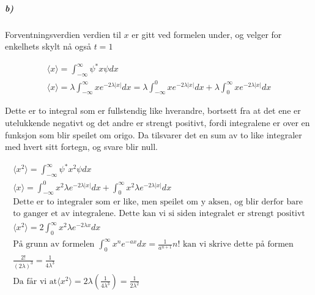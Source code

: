 \documentclass[11pt, A4paper,norsk]{article}
\begin{document}
			\subparagraph{b)}
				\begin{flushleft}
Forventningsverdien verdien til $x$ er gitt ved formelen under, og velger for enkelhets skylt nå også $t = 1$
				\end{flushleft}
				\begin{gather*}
\langle x \rangle = \int_{- \infty}^{\infty} \psi^{*} x \psi dx \\
\langle x \rangle = \lambda \int_{- \infty}^{\infty} x e^{- 2 \lambda |x|} dx = \lambda \int_{- \infty}^{0} x e^{- 2 \lambda |x|} dx + \lambda \int_{0}^{\infty} x e^{- 2 \lambda |x|} dx
				\end{gather*}
				\begin{flushleft}
Dette er to integral som er fullstendig like hverandre, bortsett fra at det ene er utelukkende negativt og det andre er strengt positivt, fordi integralene er over en funksjon som blir speilet om origo. Da tilsvarer det en sum av to like integraler med hvert sitt fortegn, og svare blir null.
				\end{flushleft}
				\begin{gather*}
\langle x^2 \rangle = \int_{- \infty}^{\infty} \psi^{*} x^2 \psi dx \\
\langle x \rangle = \int_{- \infty}^{0} x^2 \lambda e^{- 2 \lambda |x|} dx + \int_{0}^{\infty} x^2 \lambda e^{- 2 \lambda |x|} dx \\
\text{Dette er to integraler som er like, men speilet om y aksen, og blir derfor bare} \\
\text{to ganger et av integralene. Dette kan vi si siden integralet er strengt positivt} \\
\langle x^2 \rangle = 2 \int_{0}^{\infty} x^2 \lambda e^{- 2 \lambda x} dx \\
\text{På grunn av formelen $\int_{0}^{\infty} x^{n} e^{-ax} dx = \frac{1}{a^{n + 1}} n!$ kan vi skrive dette på formen} \\
\frac{2!}{(2 \lambda)^{3}} = \frac{1}{4 \lambda^3} \\
\text{Da får vi at}
\langle x^2 \rangle = 2 \lambda \left( \frac{1}{4 \lambda^3} \right) = \frac{1}{2 \lambda^2}
				\end{gather*}
\end{document}
